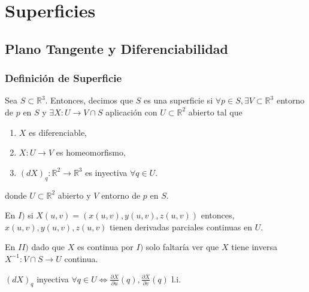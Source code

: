 \part{Superficies}
\chapter{Plano Tangente y Diferenciabilidad}

\section{Definición de Superficie}

\begin{defn}[Superficies]
  Sea $S \subset \mathbb{R}^{3}$. Entonces, decimos que $S$ es una superficie si $\forall p \in S, \exists V \subset \mathbb{R}^{3}$ entorno de $p$ en $S$ y $\exists X: U \to V \cap S$ aplicación con $U \subset \mathbb{R}^{2}$ abierto tal que
  \begin{enumerate}[label=(\roman*)]
    \item $X$ es diferenciable, 
    \item $X: U \to V$ es homeomorfismo,
    \item $(dX)_{q} : \mathbb{R}^{2} \to \mathbb{R}^{3}$ es inyectiva $ \forall q \in U$.
  \end{enumerate}
  donde $U \subset \mathbb{R}^{2}$ abierto y $V$ entorno de $p$ en $S$.
\end{defn}

\begin{obs}
  En $I)$ si $X(u, v) = (x(u, v), y(u, v), z(u, v))$ entonces, $x(u, v), y(u, v), z(u, v)$ tienen derivadas parciales continuas en $U$.
\end{obs}

\begin{obs}
  En $II)$ dado que $X$ es continua por $I)$ solo faltaría ver que $X$ tiene inversa $X^{-1}: V \cap S \to U$ continua.
\end{obs}


\begin{obs}
  $(dX)_{q}$ inyectiva $\forall q \in U \Leftrightarrow \frac{\partial{X}}{\partial{u}}(q), \frac{\partial{X}}{\partial{v}}(q)$ l.i.
\end{obs}

